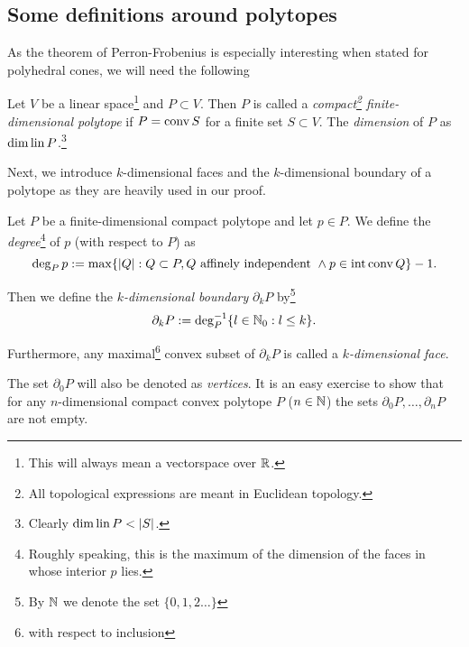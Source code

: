 \documentclass{article}
\begin{document}
\subsection{Some definitions around polytopes}

As the theorem of Perron-Frobenius is especially interesting when stated for polyhedral cones, we will need the following

\begin{definition}\label{def1}
Let $V$ be a linear space\footnote{This will always mean a vectorspace over $\mathbb{R}$.} and $P\subset V$. Then $P$ is called a \emph{compact\footnote{All topological expressions are meant in Euclidean topology.} finite-dimensional polytope} if $P=\operatorname{conv} S$ for a finite set $S\subset V$. The \emph{dimension} of $P$ as $\dim\operatorname{lin} P$.\footnote{Clearly $\dim\operatorname{lin} P< |S|$.}
\end{definition}

Next, we introduce $k$-dimensional faces and the $k$-dimensional boundary of a polytope as they are heavily used in our proof.

\begin{definition}\label{def2}
Let $P$ be a finite-dimensional compact polytope and let $p\in P$. We define the \emph{degree}\footnote{Roughly speaking, this is the maximum of the dimension of the faces in whose interior $p$ lies.} of $p$ (with respect to $P$) as
\begin{equation}
\deg_P p := \max\{|Q|:Q\subset P, Q \text{ affinely independent } \wedge p\in\text{int} \operatorname{conv} Q\}-1\text{.}
\end{equation} 

Then we define the \emph{$k$-dimensional boundary} $\partial_k{P}$ by\footnote{By $\mathbb{N}$ we denote the set $\{0,1,2\ldots\}$} 
\begin{equation}
\partial_k{P}:= \deg_P^{-1}\{l\in\mathbb{N}_0:l\leq k\}\text{.}
\end{equation}

Furthermore, any maximal\footnote{with respect to inclusion} convex subset of $\partial_k{P}$ is called a \emph{$k$-dimensional face}.
\end{definition}  

\begin{remark}\label{rem1}
The set $\partial_0 P$ will also be denoted as \emph{vertices}. It is an easy exercise to show that for any $n$-dimensional compact convex polytope $P$ ($n\in\mathbb{N}$) the sets $\partial_0 P,\ldots, \partial_n P$ are not empty. 
\end{remark}
\end{document}
